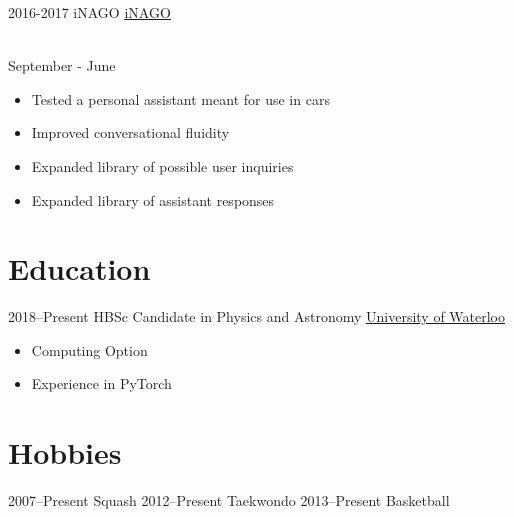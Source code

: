 \documentclass[]{cv-style}          %
\begin{document}
\begin{entrylist}
\entry
  {2016-2017}
  {iNAGO}
  {\href{http://www.inago.com}{\underline{iNAGO}}}
  {\\
  September - June
  \begin{itemize}
      \item Tested a personal assistant meant for use in cars
      \item Improved conversational fluidity
      \item Expanded library of possible user inquiries
      \item Expanded library of assistant responses
  \end{itemize}}
\end{entrylist}

\section{Education}

\begin{entrylist}
\entry
{2018--Present}
{HBSc {\normalfont Candidate in Physics and Astronomy}}
{\href{https://uwaterloo.ca/}{\underline{University of Waterloo}}\vspace{-0.35cm}
}{\begin{itemize}\item Computing Option
\item Experience in PyTorch \end{itemize}}



\end{entrylist}


\section{Hobbies}
\begin{entrylist}
    \entry
            {2007--Present}
            {Squash}{}{}
    \entry
            {2012--Present}
            {Taekwondo}{}
            {}
    \entry
            {2013--Present}
            {Basketball}{}{}
\end{entrylist}






\newpage
\end{document}
